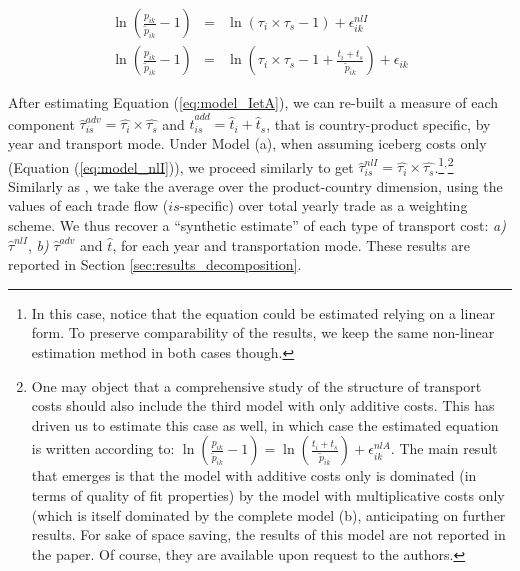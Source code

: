 \documentclass[a4paper,11pt]{article}
\begin{document}
\begin{eqnarray}
\ln\left(\frac{p_{ik}}{\widetilde{p}_{ik}}-1 \right)&=& \ln \left(\tau_{i}\times\tau_{s}-1 \right) + \epsilon^{nlI}_{ik} \label{eq:model_nlI} \\
\ln\left(\frac{p_{ik}}{\widetilde{p}_{ik}}-1 \right)&=& \ln \left(\tau_{i} \times \tau_{s}-1 +\frac{t_{i} + t_{s}}{\widetilde{p}_{ik}}\right) + \epsilon_{ik} \label{eq:model_IetA}
\end{eqnarray}

After estimating Equation (\ref{eq:model_IetA}), we can re-built a measure of each component $\widehat{\tau}^{adv}_{is} = \widehat{\tau_{i}} \times \widehat{\tau_{s}}$ and $\widehat{t}^{add}_{is} = \widehat{t}_{i} + \widehat{t}_{s}$, that is country-product specific, by year and transport mode. Under Model (a), when assuming iceberg costs only (Equation (\ref{eq:model_nlI})), we proceed similarly to get $\widehat{\tau}^{nlI}_{is} = \widehat{\tau_{i}} \times \widehat{\tau_{s}}$.\footnote{In this case, notice that the equation could be estimated relying on a linear form. To preserve comparability of the results, we keep the same non-linear estimation method in both cases though.}$^{,}$\footnote{One may object that a comprehensive study of the structure of transport costs should also include the third model with only additive costs. This has driven us to estimate this case as well, in which case the estimated equation is written according to: $\ln\left(\frac{p_{ik}}{\widetilde{p}_{ik}}-1 \right)= \ln \left(\frac{t_{i} + t_{s}}{\widetilde{p}_{ik}}\right) + \epsilon^{nlA}_{ik}$. The main result that emerges is that the model with additive costs only is dominated (in terms of quality of fit properties) by the model with multiplicative costs only (which is itself dominated by the complete model (b), anticipating on further results. For sake of space saving, the results of this model are not reported in the paper. Of course, they are available upon request to the authors.} Similarly as \citet{Irrazabal_2015}, we take the average over the product-country dimension, using the values of each trade flow ($is$-specific) over total yearly trade as a weighting scheme. We thus recover a ``synthetic estimate'' of each type of transport cost: \textit{a)} $\widehat{\tau}^{nlI}$, \textit{b)} $\widehat{\tau}^{adv}$ and $\widehat{t}$, for each year and transportation mode. These results are reported in Section \ref{sec:results_decomposition}.
\end{document}
